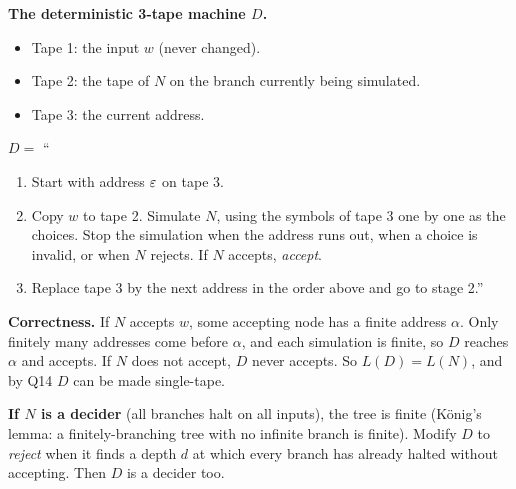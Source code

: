 \begin{soln}
\textbf{The deterministic 3-tape machine $D$.}
\begin{itemize}
\item Tape 1: the input $w$ (never changed).
\item Tape 2: the tape of $N$ on the branch currently being simulated.
\item Tape 3: the current address.
\end{itemize}
$D=$ ``\begin{enumerate}
\item Start with address $\varepsilon$ on tape 3.
\item Copy $w$ to tape 2. Simulate $N$, using the symbols of tape 3 one by one as the choices. Stop the simulation when the address runs out, when a choice is invalid, or when $N$ rejects. If $N$ accepts, \emph{accept}.
\item Replace tape 3 by the next address in the order above and go to stage 2.''
\end{enumerate}

\textbf{Correctness.} If $N$ accepts $w$, some accepting node has a finite address $\alpha$. Only finitely many addresses come before $\alpha$, and each simulation is finite, so $D$ reaches $\alpha$ and accepts. If $N$ does not accept, $D$ never accepts. So $L(D)=L(N)$, and by Q14 $D$ can be made single-tape.

\textbf{If $N$ is a decider} (all branches halt on all inputs), the tree is finite (König's lemma: a finitely-branching tree with no infinite branch is finite). Modify $D$ to \emph{reject} when it finds a depth $d$ at which every branch has already halted without accepting. Then $D$ is a decider too.
\end{soln}

